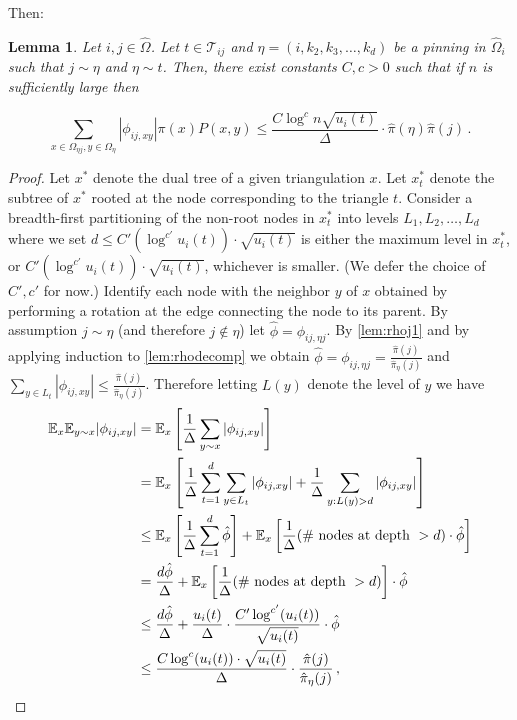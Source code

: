 \documentclass[a4paper, 12p]{article}
\numberwithin{equation}{section}
\newcommand{\Exp}{\mathbb{E}}
\newcommand{\Omorproj}{\hat{\Omega}}
\newcommand{\piorproj}{\hat{\pi}}
\newtheorem{lemma}[theorem]{Lemma}
\begin{document}
Then:
\begin{lemma}
    Let $i, j \in \Omorproj$. Let $t \in \mathcal{T}_{ij}$ and $\eta = (i, k_2, k_3, \dots, k_d)$ be a pinning in $\Omorproj_i$ such that $j \sim \eta$ and $\eta \sim t$. Then, there exist constants $C, c > 0$ such that if $n$ is sufficiently large then
    
    \[
        \sum_{x\in \Omega_{\eta j}, y \in \Omega_{\eta}}|\phi_{ij,xy}|\pi(x)P(x, y) \leq \frac{C\log^c n \sqrt{u_i(t)}}{\Delta}\cdot \piorproj(\eta) \piorproj(j)\,.
    \]
    
    \label{lem:ldirstronger}
\end{lemma}
\begin{proof}
    Let $x^*$ denote the dual tree of a given triangulation $x$. Let $x_t^*$ denote the subtree of $x^*$ rooted at the node corresponding to the triangle $t$. Consider a breadth-first partitioning of the non-root nodes in $x_t^*$ into levels $L_1, L_2, \dots, L_d$ where we set $d \leq C'(\log^{c'}u_i(t)) \cdot \sqrt {u_i(t)}$ is either the maximum level in $x_t^*$, or $C'(\log^{c'} u_i(t)) \cdot \sqrt {u_i(t)}$, whichever is smaller. (We defer the choice of $C', c'$ for now.) Identify each node with the neighbor $y$ of $x$ obtained by performing a rotation at the edge connecting the node to its parent. By assumption $j \sim \eta$ (and therefore $j \notin \eta$) let $\hat\phi = \phi_{ij,\eta j}$. By  \cref{lem:rhoj1} and by applying induction to \cref{lem:rhodecomp} we obtain  $\hat\phi = \phi_{ij,\eta j} = \frac{\piorproj(j)}{\piorproj_{\eta}(j)}$ and $\sum_{y \in L_t}|\phi_{ij,xy}| \leq \frac{\piorproj(j)}{\piorproj_{\eta}(j)}$. Therefore letting $L(y)$ denote the level of $y$ we have
    \begin{align}
        \Exp_x \Exp_{y \sim x} |\phi_{ij,xy}| &= \Exp_x \left[\frac{1}{\Delta} \sum_{y \sim x} |\phi_{ij,xy}|\right] \nonumber \\
        &= \Exp_x\left[\frac{1}{\Delta}\sum_{t=1}^d \sum_{y \in L_t}|\phi_{ij,xy}| + \frac{1}{\Delta}\sum_{y: L(y) > d}|\phi_{ij,xy}|\right] \nonumber \\
        &\leq \Exp_x\left[\frac{1}{\Delta}\sum_{t=1}^d\hat\phi\right] + \Exp_x \left[\frac{1}{\Delta}(\textnormal{\# nodes at depth }> d) \cdot\hat\phi\right] \nonumber \\
        &= \frac{d \hat\phi}{\Delta} + \Exp_x \left[\frac{1}{\Delta}(\textnormal{\# nodes at depth }> d) \right]\cdot\hat\phi \nonumber \\
        &\leq \frac{d \hat\phi}{\Delta} + \frac{u_i(t)}{\Delta}\cdot \frac{C'\log^{c'} (u_i(t))}{\sqrt {u_i(t)}}\cdot \hat\phi \label{eqn:depthbound} \\
        &\leq \frac{C\log^c (u_i(t)) \cdot \sqrt {u_i(t)}}{\Delta}\cdot \frac{\piorproj(j)}{\piorproj_{\eta}(j)}\,,\label{eqn:expfinal}
    \end{align}


\end{proof}
\end{document}
